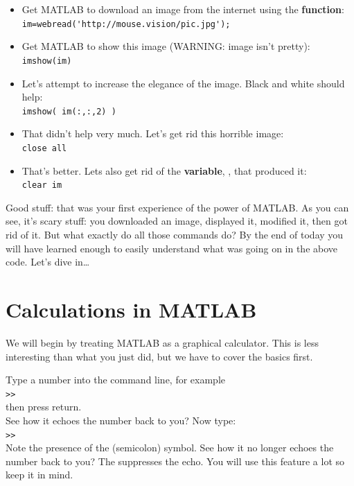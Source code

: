 \documentclass{article}
\begin{document}
\begin{itemize}
\item Get MATLAB to download an image from the internet using the  \textbf{function}:\\
\verb|im=webread('http://mouse.vision/pic.jpg');|\\
\item Get MATLAB to show this image (WARNING: image isn't pretty):\\
\verb|imshow(im)|\\
\item Let's attempt to increase the elegance of the image. Black and white should help:\\
\verb|imshow( im(:,:,2) )|\\
\item That didn't help very much. Let's get rid this horrible image:\\
\verb|close all|\\
\item That's better. Lets also get rid of the \textbf{variable}, , that produced it:\\
\verb|clear im|
\end{itemize}

Good stuff: that was your first experience of the power of MATLAB.
As you can see, it's  scary stuff: you downloaded an image, displayed it, modified it, then got rid of it.
But what exactly do all those commands do?
By the end of today you will have learned enough to easily understand what was going on in the above code.
Let's dive in\ldots


\pagebreak
\section{Calculations in MATLAB}

We will begin by treating MATLAB as a graphical calculator.
This is less interesting than what you just did, but we have to cover the basics first.

Type a number into the command line, for example\\
\verb|>>| \\
then press return.\\
See how it echoes the number back to you? Now type:\\
\verb|>>| \\
Note the presence of the \mcode{;} (semicolon) symbol.
See how it no longer echoes the number back to you?
The \mcode{;} suppresses the echo.
You will use this feature a lot so keep it in mind.
\end{document}
